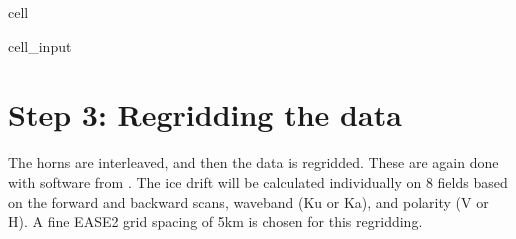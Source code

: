 \documentclass[letterpaper,10pt,english]{jupyterBook}
\begin{document}
\begin{sphinxuseclass}{cell}\begin{sphinxVerbatimInput}

\begin{sphinxuseclass}{cell_input}
\begin{sphinxVerbatim}[commandchars=\\\{\}]

  
\PYG{p}{[}\PYG{p}{]} \PYG{p}{[}\PYG{p}{]}  
\end{sphinxVerbatim}

\end{sphinxuseclass}\end{sphinxVerbatimInput}

\end{sphinxuseclass}

\section{Step 3: Regridding the data}
\label{\detokenize{CIMR_L2_Sea_Ice_Drift_preproc:step-3-regridding-the-data}}
\sphinxAtStartPar
The horns are interleaved, and then the data is regridded. These are again done with software from . The ice drift will be calculated individually on 8 fields based on the forward and backward scans, waveband (Ku or Ka), and polarity (V or H). A fine EASE2 grid spacing of 5km is chosen for this regridding.
\end{document}
